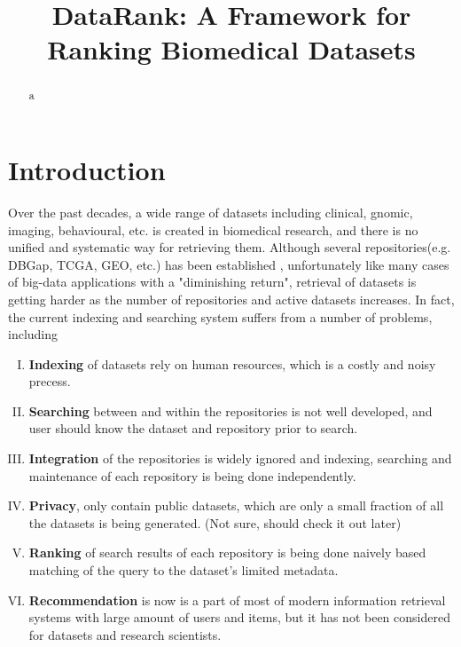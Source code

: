 \documentclass[twoside,11pt]{article}
\begin{document}
\title{DataRank: A Framework for Ranking Biomedical Datasets}


\editor{}

\maketitle
\begin{abstract} 
a
\end{abstract} 


\section{Introduction} \label{sec:introduction}
Over the past decades, a wide range of datasets including clinical, gnomic, imaging, behavioural, etc. is created in biomedical research, and there is no unified and systematic way for retrieving them. Although several repositories(e.g. DBGap, TCGA, GEO, etc.) has been established \cite{nih-repo}, unfortunately like many cases of big-data applications with a "diminishing return", retrieval of datasets is getting harder as the number of repositories and active datasets increases. In fact, the current indexing and searching system suffers from a number of problems, including
\begin{enumerate}[(I)]
	\item {\bf Indexing} of datasets rely on human resources, which is a costly and noisy precess. \label{item:indexing}
	\item {\bf Searching} between and within the repositories is not well developed, and user should know the dataset and repository prior to search.
	\item {\bf Integration} of the repositories is widely ignored and indexing, searching and maintenance of each repository is being done independently.
	\item {\bf Privacy}, only contain public datasets, which are only a small fraction of all the datasets is being generated. (Not sure, should check it out later)
	\item {\bf Ranking} of search results of each repository is being done naively based matching of the query to the dataset's limited metadata.
	\item {\bf Recommendation} is now is a part of most of modern information retrieval systems with large amount of users and items, but it has not been considered for datasets and research scientists. \label{item:recommendation}
\end{enumerate}
\end{document}
